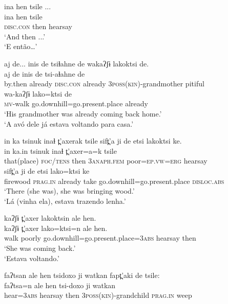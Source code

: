 \documentclass[output=paper,
modfonts,nonflat
]{langsci/langscibook}
\begin{document}
\ea ina hen tsile ...\\[.3em]
\gll ina           hen   tsile\\          
\textsc{disc.con}  then  hearsay\\ 
\glt `And then ...'\\
‘E então…’
\z

\ea aj de... inis de tsiɬahne de wakaʔʃɨ lakoktsi de.\\[.3em]
\gll  aj   de  inis  de  tsi-aɬahne  de\\
by.then  already \textsc{disc.con} already \textsc{3poss(kin)}-grandmother  pitiful\\



\gll wa-kaʔʃɨ  lako=ktsi de\\  
\textsc{mv}-walk   go.downhill=go.present.place  already\\
\glt `His grandmother was already coming back home.'\\
‘A avó dele já estava voltando para casa.’
\z

\ea in ka tsinuk inaɬ  t̪'axerak tsile sift̪'a ji de etsi lakoktsi ke.\\[.3em]
\gll in  ka.in  tsinuk  inaɬ  t̪'axer=a=k tsile\\
that(place)  \textsc{foc/tens}  then  \textsc{3anaph.fem}   poor=\textsc{ep.vw}=\textsc{erg}  hearsay\\



\gll sift̪'a    ji   de	 etsi lako=ktsi  ke\\
firewood  \textsc{prag.in}   already  take  go.downhill=go.present.place  \textsc{disloc.abs}\\
\glt `There (she was), she was bringing wood.'\\
‘Lá (vinha ela), estava trazendo lenha.’
\z

\ea kaʔʃɨ t̪'axer lakoktsin ale hen.\\[.3em]
\gll kaʔʃɨ  t̪'axer   lako=ktsi=n ale          hen.\\
walk  poorly  go.downhill=go.present.place=\textsc{3abs}    hearsay  then\\
\glt `She was coming back.'\\
`Estava voltando.’
\z

\ea faʔtsan ale hen tsidoxo ji watkan fapt̪'aki de tsile:\\[.3em]
\gll faʔtsa=n  ale  hen tsi-doxo ji watkan\\  
hear=\textsc{3abs}  hearsay  then  \textsc{3poss(kin)}-grandchild \textsc{prag.in}  weep\\
\end{document}
